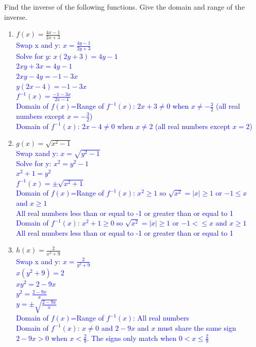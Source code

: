 \documentclass{ximera}
\begin{document}
\begin{exercise}
    Find the inverse of the following functions.  Give the domain and range of the inverse. 
    \begin{enumerate}
    \item $f(x)=\frac{4x-1}{2x+3}$\\
    \textcolor{blue}{ Swap x and y: $x=\frac{4y-1}{2y+3}$\\
    Solve for $y$: $x(2y+3)=4y-1$\\
     $2xy+3x=4y-1$\\ 
     $2xy-4y=-1-3x$\\
     $y(2x-4)=-1-3x$\\
    $f^{-1}(x)=\frac{-1-3x}{2x-4}$\\
    Domain of $f(x)$=Range of $f^{-1}(x)$: $2x+3\neq 0$ when $x\neq -\frac32$ (all real numbers except $x=-\frac32$)\\
    Domain of $f^{-1}(x)$: $2x-4\neq0$ when $x\neq 2$ (all real numbers except $x=2$)}

    \item $g(x)=\sqrt{x^2-1}$\\
    \textcolor{blue}{ Swap xand y: $x=\sqrt{y^2-1}$\\
    Solve for y: $x^2=y^2-1$\\ 
    $x^2+1=y^2$\\
    $f^{-1}(x)=\pm \sqrt{x^2+1}$\\
    Domain of $f(x)$=Range of $f^{-1}(x)$: $x^2\geq 1$ so $\sqrt{x^2}=|x|\geq 1$ or $-1\leq x$ and $x\geq 1 $\\
    All real numbers less than or equal to -1 or greater than or equal to 1\\
    Domain of $f^{-1}(x)$: $x^2+1\geq 0$ so $\sqrt{x^2}=|x|\geq 1$ or $-1<\leq x$ and $x\geq 1$\\
     All real numbers less than or equal to -1 or greater than or equal to 1}\\
    
    \item $h(x)=\frac{2}{x^2+9}$\\
    \textcolor{blue}{ Swap x and y: $x=\frac{2}{y^2+9}$\\
    $x(y^2+9)=2$\\
    $xy^2=2-9x$\\
    $y^2=\frac{2-9x}{x}$\\
    $y=\pm\sqrt{ \frac{2-9x}{x}}$\\
        Domain of $f(x)$=Range of $f^{-1}(x)$: All real numbers\\
    Domain of $f^{-1}(x)$: $x\neq 0$ and $2-9x$ and $x$ must share the same sign\\
    $2-9x>0$ when $x<\frac29$.  The signs only match when $0<x\leq \frac29$}
    

\end{enumerate}
\end{exercise}
\end{document}
